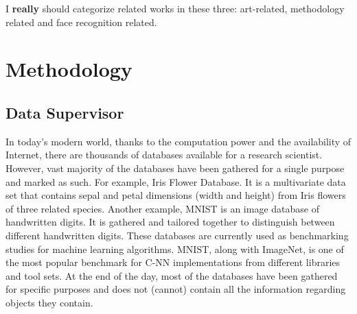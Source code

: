 \documentclass[runningheads]{llncs}
\begin{document}
I \textbf{really} should categorize related works in these three: art-related, methodology related and face recognition related.

\cite{van2015toward}\cite{zhu2012face}\cite{XiongD13}\cite{srinivasan2015computerized}\cite{Crowley14a}\cite{googleImage}\cite{pascal-voc-2012}\cite{ILSVRC15}\cite{agrawal2014analyzing}\cite{mathias2014face}\cite{cheng2015semantically}\cite{lempitsky2010learning}\cite{grosso2012understanding}\cite{ng2012recognizing}\cite{castrillon2013improving}\cite{portraitpainting-npar11}

\section{Methodology}

\subsection{Data Supervisor}\label{[ss:datasupervisor]}


In today's modern world, thanks to the computation power and the availability of Internet, there are thousands of databases available for a research scientist. However, vast majority of the databases have been gathered for a single purpose and marked as such. For example, Iris Flower Database\cite{fisher1936use}. It is a multivariate data set that contains sepal and petal dimensions (width and height) from Iris flowers of three related species. Another example, MNIST\cite{lecun1998mnist} is an image database of handwritten digits. It is gathered and tailored together to distinguish between different handwritten digits. These databases are currently used as benchmarking studies for machine learning algorithms. MNIST, along with ImageNet\cite{ILSVRC15}, is one of the most popular benchmark for C-NN implementations from different libraries and tool sets. At the end of the day, most of the databases have been gathered for specific purposes and does not (cannot) contain all the information regarding objects they contain.
\end{document}
